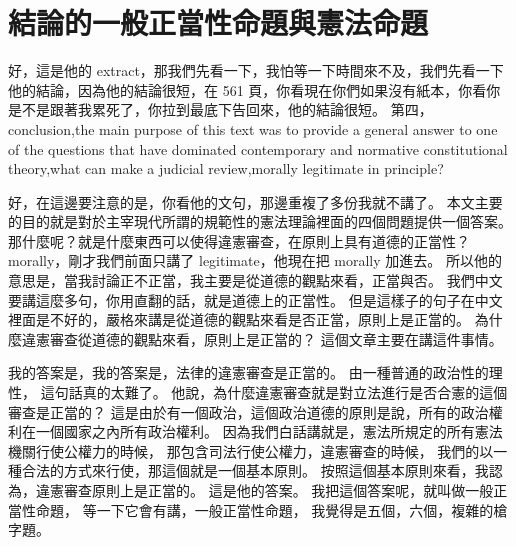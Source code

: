 \section{結論的一般正當性命題與憲法命題}

\hypertarget{w02:cue:19}{}好，這是他的 extract，那我們先看一下，我怕等一下時間來不及，我們先看一下他的結論，因為他的結論很短，在 561 頁，你看現在你們如果沒有紙本，你看你是不是跟著我累死了，你拉到最底下告回來，他的結論很短。
\hypertarget{w02:cue:20}{}第四，conclusion,the main purpose of this text was to provide a general answer to one of the questions that have dominated contemporary and normative constitutional theory,what can make a judicial review,morally legitimate in principle?

\hypertarget{w02:cue:21}{}好，在這邊要注意的是，你看他的文句，那邊重複了多份我就不講了。
\hypertarget{w02:cue:22}{}本文主要的目的就是對於主宰現代所謂的規範性的憲法理論裡面的四個問題提供一個答案。
\hypertarget{w02:cue:23}{}那什麼呢？就是什麼東西可以使得違憲審查，在原則上具有道德的正當性？
\hypertarget{w02:cue:24}{}morally，剛才我們前面只講了 legitimate，他現在把 morally 加進去。
\hypertarget{w02:cue:25}{}所以他的意思是，當我討論正不正當，我主要是從道德的觀點來看，正當與否。
\hypertarget{w02:cue:26}{}我們中文要講這麼多句，你用直翻的話，就是道德上的正當性。
\hypertarget{w02:cue:27}{}但是這樣子的句子在中文裡面是不好的，嚴格來講是從道德的觀點來看是否正當，原則上是正當的。
\hypertarget{w02:cue:28}{}為什麼違憲審查從道德的觀點來看，原則上是正當的？
\hypertarget{w02:cue:29}{}這個文章主要在講這件事情。

\hypertarget{w02:cue:30}{}我的答案是，我的答案是，法律的違憲審查是正當的。
\hypertarget{w02:cue:31}{}由一種普通的政治性的理性，
\hypertarget{w02:cue:32}{}這句話真的太難了。
\hypertarget{w02:cue:33}{}他說，為什麼違憲審查就是對立法進行是否合憲的這個審查是正當的？
\hypertarget{w02:cue:34}{}這是由於有一個政治，這個政治道德的原則是說，所有的政治權利在一個國家之內所有政治權利。
\hypertarget{w02:cue:35}{}因為我們白話講就是，憲法所規定的所有憲法機關行使公權力的時候，
\hypertarget{w02:cue:36}{}那包含司法行使公權力，違憲審查的時候，
\hypertarget{w02:cue:37}{}我們的以一種合法的方式來行使，那這個就是一個基本原則。
\hypertarget{w02:cue:38}{}按照這個基本原則來看，我認為，違憲審查原則上是正當的。
\hypertarget{w02:cue:39}{}這是他的答案。
\hypertarget{w02:cue:40}{}我把這個答案呢，就叫做一般正當性命題，
\hypertarget{w02:cue:41}{}等一下它會有講，一般正當性命題，
\hypertarget{w02:cue:42}{}我覺得是五個，六個，複雜的槍字題。

